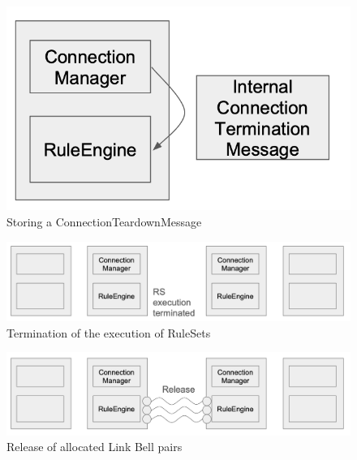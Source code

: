 \begin{figure}[H]
  \centerline{\includegraphics[width=\columnwidth]{images/internal_connection_teardown_message.png}}
  \caption{Storing a ConnectionTeardownMessage}
\end{figure}

\begin{figure}[H]
  \centerline{\includegraphics[width=\columnwidth]{images/ruleset_execution_terminated.png}}
  \caption{Termination of the execution of RuleSets}
\end{figure}

\begin{figure}[H]
  \centerline{\includegraphics[width=\columnwidth]{images/link_release.png}}
  \caption{Release of allocated Link Bell pairs}
\end{figure}


